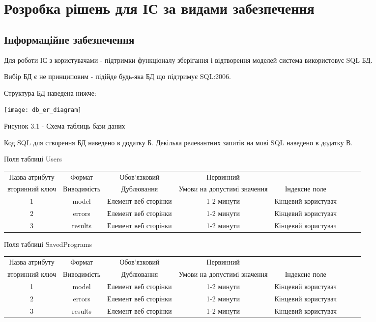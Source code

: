 \chapter{Розробка рішень для ІС за видами забезпечення} 
\label{chap:third}

\section{Інформаційне забезпечення}

Для роботи ІС з користувачами - підтримки функціоналу зберігання і відтворення моделей система використовує SQL БД.

Вибір БД є не принциповим - підійде будь-яка БД що підтримує SQL:2006.

Структура БД наведена нижче:

\begin{center}

\texttt{[image: db\_er\_diagram]}

Рисунок 3.1 - Схема таблиць бази даних
\end{center}

Код SQL для створення БД наведено в додатку Б. Декілька релевантних запитів на мові SQL наведено в додатку В.


\begin{flushright}\small {Поля таблиці Users} \end{flushright}
\small{
\begin{tabular}{ | c | c | c | c | c | c | c | c | }
\hline
 Назва атрибуту & Формат& Обов'язковий & Первинний \\ вторинний  ключ & Виводимість & Дублювання & Умови на допустимі значення & Індексне поле \\
\hline
 1 & model & Елемент веб сторінки & 1-2 минути & Кінцевий користувач \\  
\hline
 2 & errors & Елемент веб сторінки & 1-2 минути & Кінцевий користувач \\  
\hline
 3 & results & Елемент веб сторінки & 1-2 минути & Кінцевий користувач \\  
\hline
\end{tabular}
}

\begin{flushright}\small {Поля таблиці SavedPrograms} \end{flushright}
\small{
\begin{tabular}{ | c | c | c | c | c | c | c | c | }
\hline
 Назва атрибуту & Формат& Обов'язковий & Первинний \\ вторинний  ключ & Виводимість & Дублювання & Умови на допустимі значення & Індексне поле \\
\hline
 1 & model & Елемент веб сторінки & 1-2 минути & Кінцевий користувач \\  
\hline
 2 & errors & Елемент веб сторінки & 1-2 минути & Кінцевий користувач \\  
\hline
 3 & results & Елемент веб сторінки & 1-2 минути & Кінцевий користувач \\  
\hline
\end{tabular}
}

